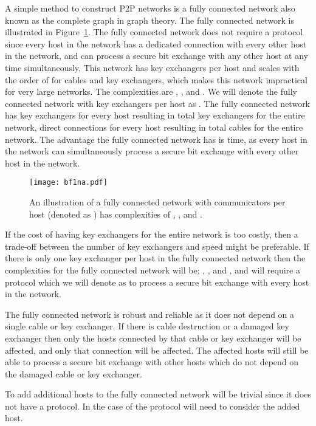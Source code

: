 \documentclass[a4paper,12pt,pdftex]{article}
\begin{document}
A simple method to construct P2P networks is a fully connected network also known as the complete graph in graph theory. The fully connected network is illustrated in Figure~\ref{fig:bf1}. The fully connected network does not require a protocol since every host in the network has a dedicated connection with every other host in the network, and can process a secure bit exchange with any other host at any time simultaneously. This network has  key exchangers per host and scales with the order of  for cables and key exchangers, which makes this network impractical for very large networks. The complexities are , , and . We will denote the fully connected network with  key exchangers per host as . The fully connected network has  key exchangers for every host resulting in  total key exchangers for the entire network,  direct connections for every host resulting in  total cables for the entire network. The advantage the fully connected network has is time, as every host in the network can simultaneously process a secure bit exchange with every other host in the network.

\begin{figure}[h]
    \caption{An illustration of a fully connected network with  communicators per host (denoted as ) has complexities of , , and . }
    \label{fig:bf1}
  \centering
\texttt{[image: bf1na.pdf]}
\end{figure}

If the cost of having  key exchangers for the entire network is too costly, then a trade-off between the number of key exchangers and speed might be preferable. If there is only one key exchanger per host in the fully connected network then the complexities for the fully connected network  will be; , , and , and will require a protocol which we will denote as  to process a secure bit exchange with every host in the network.

The fully connected network is robust and reliable as it does not depend on a single cable or key exchanger. If there is cable destruction or a damaged key exchanger then only the hosts connected by that cable or key exchanger will be affected, and only that connection will be affected. The affected hosts will still be able to process a secure bit exchange with other hosts which do not depend on the damaged cable or key exchanger. 

To add additional hosts to the fully connected network will be trivial since it does not have a protocol. In the case of  the protocol will need to consider the added host.
\end{document}
